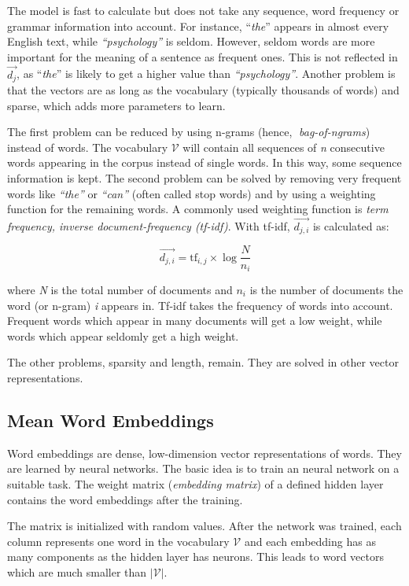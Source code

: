 The model is fast to calculate but does not take any sequence, word frequency or grammar information into account. For instance, \enquote{\emph{the}} appears in almost every English text, while \emph{\enquote{psychology}} is seldom. However, seldom words are more important for the meaning of a sentence as frequent ones. This is not reflected in $\vec{d_j}$, as \enquote{\emph{the}} is likely to get a higher value than \emph{\enquote{psychology}}. Another problem is that the vectors are as long as the vocabulary (typically thousands of words) and sparse, which adds more parameters to learn.

The first problem can be reduced by using n-grams (hence, \emph{bag-of-ngrams}) instead of words. The vocabulary $\mathcal{V}$ will contain all sequences of \emph{n} consecutive words appearing in the corpus instead of single words. In this way, some sequence information is kept. The second problem can be solved by removing very frequent words like \emph{\enquote{the}} or \emph{\enquote{can}} (often called stop words) and by using a weighting function for the remaining words. A commonly used weighting function is \emph{term frequency, inverse document-frequency (tf-idf)}. With tf-idf, $\vec{d_{j,i}}$ is calculated as:

\[\vec{d_{j,i}} = \text{tf}_{i,j} \times \log{ \frac{N}{n_i} } \]

where \emph{N} is the total number of documents and $n_i$ is the number of documents the word (or n-gram) \emph{i} appears in. Tf-idf takes the frequency of words into account. Frequent words which appear in many documents will get a low weight, while words which appear seldomly get a high weight.

The other problems, sparsity and length, remain. They are solved in other vector representations.


\subsection{Mean Word Embeddings}
Word embeddings are dense, low-dimension vector representations of words. They are learned by neural networks. The basic idea is to train an neural network on a suitable task. The weight matrix (\emph{embedding matrix}) of a defined hidden layer contains the word embeddings after the training.

The matrix is initialized with random values. After the network was trained, each column represents one word in the vocabulary $\mathcal{V}$ and each embedding has as many components as the hidden layer has neurons. This leads to word vectors which are much smaller than $|\mathcal{V}|$.

